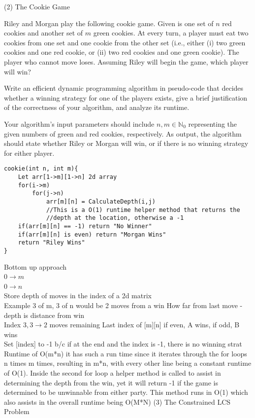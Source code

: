 \documentclass[11pt]{amsart}
\begin{document}
(2) The Cookie Game\medskip

Riley and Morgan play the following cookie game. Given is one set of $n$ red cookies and another set of $m$ green 
cookies. At every turn, a player must eat two cookies from one set and one cookie from the other set (i.e., 
either (i) two green cookies and one red cookie, or (ii) two red cookies and one green cookie). The player who 
cannot move loses. Assuming Riley will begin the game, which player will win?\medskip

Write an efficient dynamic programming algorithm in pseudo-code that decides whether a winning strategy for one of the players exists,
give a brief justification of the correctness of your algorithm, and analyze its runtime.\medskip

Your algorithm's input parameters should include $n, m \in \mathbb{N}_0$ representing the given numbers of green 
and red cookies, respectively. As output, the algorithm should state whether Riley or Morgan will win, or if there is no
winning strategy for either player.\\
\begin{lstlisting}
cookie(int n, int m){
    Let arr[1->m][1->n] 2d array
    for(i->m)
        for(j->n)
            arr[m][n] = CalculateDepth(i,j) 
            //This is a O(1) runtime helper method that returns the 
            //depth at the location, otherwise a -1
    if(arr[m][n] == -1) return "No Winner"
    if(arr[m][n] is even) return "Morgan Wins"
    return "Riley Wins"
}
\end{lstlisting}
Bottom up approach\\
0$\rightarrow m$\\
0$\rightarrow n$
\\
Store depth of moves in the index of a 2d matrix
\\
Example
3 of m, 3 of n would be 2 moves from a win
How far from last move - depth is distance from win
\\
Index $3, 3 \rightarrow 2$ moves remaining
Last index of [m][n] if even, A wins, if odd, B wins
\\
Set [index] to -1 b/c if at the end and the index is -1, there is no winning strat
Runtime of O(m*n)
it has such a run time since it iterates through the for loops n times m times, resulting in m*n, with every other line being a constant runtime of O(1). Inside the second for loop a helper method is called to assist in determining the depth from the win, yet it will return -1 if the game is determined to be unwinnable from either party. This method runs in O(1) which also assists in the overall runtime being O(M*N)
\newpage
(3) The Constrained LCS Problem\medskip
\end{document}
